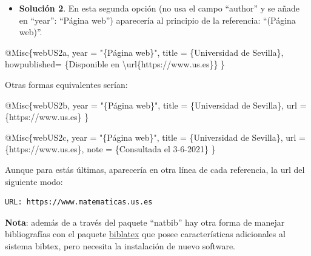 \documentclass[12pt,a4paper,oneside,]{article}
\newenvironment{Shaded}{\begin{snugshade}}{\end{snugshade}}
\newcommand{\CharTok}[1]{\textcolor[rgb]{0.31,0.60,0.02}{#1}}
\newcommand{\DataTypeTok}[1]{\textcolor[rgb]{0.13,0.29,0.53}{#1}}
\newcommand{\NormalTok}[1]{#1}
\newcommand{\OtherTok}[1]{\textcolor[rgb]{0.56,0.35,0.01}{#1}}
\newcommand{\StringTok}[1]{\textcolor[rgb]{0.31,0.60,0.02}{#1}}
\newcommand{\VariableTok}[1]{\textcolor[rgb]{0.00,0.00,0.00}{#1}}
\providecommand{\tightlist}{%
  \setlength{\itemsep}{0pt}\setlength{\parskip}{0pt}}
\numberwithin{dummy}{section}
\theoremstyle{ocrenumbox}
\theoremstyle{blacknumex}
\theoremstyle{blacknumbox}
\theoremstyle{ocrenum}
\theoremstyle{ocrenum}
\begin{document}
\begin{itemize}
\tightlist
\item
  \textbf{Solución 2}. En esta segunda opción (no usa el campo
  ``author'' y se añade en ``year'': ``Página web'') aparecería al
  principio de la referencia: ``(Página web)''.
\end{itemize}

\begin{Shaded}
\begin{Highlighting}[]
\VariableTok{@Misc}\NormalTok{\{}\OtherTok{webUS2a}\NormalTok{,}
  \DataTypeTok{year}\NormalTok{ = "}\StringTok{\{Página web\}}\NormalTok{",}
  \DataTypeTok{title}\NormalTok{ = \{Universidad de Sevilla\},}
  \DataTypeTok{howpublished}\NormalTok{= \{Disponible en }\CharTok{\textbackslash{}url}\NormalTok{\{https://www.us.es\}\}}
\NormalTok{\}}
\end{Highlighting}
\end{Shaded}

Otras formas equivalentes serían:

\begin{Shaded}
\begin{Highlighting}[]
\VariableTok{@Misc}\NormalTok{\{}\OtherTok{webUS2b}\NormalTok{,}
  \DataTypeTok{year}\NormalTok{ = "}\StringTok{\{Página web\}}\NormalTok{",}
  \DataTypeTok{title}\NormalTok{ = \{Universidad de Sevilla\},}
  \DataTypeTok{url}\NormalTok{ = \{https://www.us.es\}}
\NormalTok{\}}
\end{Highlighting}
\end{Shaded}

\begin{Shaded}
\begin{Highlighting}[]
\VariableTok{@Misc}\NormalTok{\{}\OtherTok{webUS2c}\NormalTok{,}
  \DataTypeTok{year}\NormalTok{ = "}\StringTok{\{Página web\}}\NormalTok{",}
  \DataTypeTok{title}\NormalTok{ = \{Universidad de Sevilla\},}
  \DataTypeTok{url}\NormalTok{ = \{https://www.us.es\},}
  \DataTypeTok{note}\NormalTok{ = \{Consultada el 3{-}6{-}2021\}}
\NormalTok{\}}
\end{Highlighting}
\end{Shaded}

Aunque para estás últimas, aparecería en otra línea de cada referencia,
la url del siguiente modo:

\begin{verbatim}
URL: https://www.matematicas.us.es
\end{verbatim}

\textbf{Nota}: además de a través del paquete ``natbib'' hay otra forma
de manejar bibliografías con el paquete
\href{https://www.overleaf.com/learn/latex/Bibliography_management_with_biblatex}{biblatex}
que posee características adicionales al sistema bibtex, pero necesita
la instalación de nuevo software.
\end{document}
